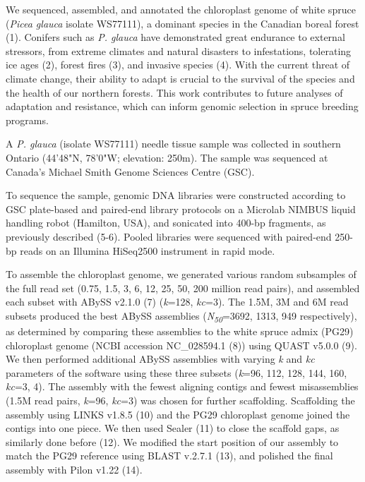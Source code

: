 \documentclass[titlepage,11pt, oneside]{article}   	%
\begin{document}
We sequenced, assembled, and annotated the chloroplast genome of white spruce (\textit{Picea glauca} isolate WS77111), a dominant species in the Canadian boreal forest (1). Conifers such as \textit{P. glauca} have demonstrated great endurance to external stressors, from extreme climates and natural disasters to infestations, tolerating ice ages (2), forest fires (3), and invasive species (4). With the current threat of climate change, their ability to adapt is crucial to the survival of the species and the health of our northern forests. This work contributes to future analyses of adaptation and resistance, which can inform genomic selection in spruce breeding programs.
\newline
\par
A \textit{P. glauca} (isolate WS77111) needle tissue sample was collected in southern Ontario (44'48"N, 78'0"W; elevation: 250m). The sample was sequenced at Canada’s Michael Smith Genome Sciences Centre (GSC).
\newline
\par
To sequence the sample, genomic DNA libraries were constructed according to GSC plate-based and paired-end library protocols on a Microlab NIMBUS liquid handling robot (Hamilton, USA), and sonicated into 400-bp fragments, as previously described (5-6). Pooled libraries were sequenced with paired-end 250-bp reads on an Illumina HiSeq2500 instrument in rapid mode.
\newline
\par
To assemble the chloroplast genome, we generated various random subsamples of the full read set (0.75, 1.5, 3, 6, 12, 25, 50, 200 million read pairs), and assembled each subset with ABySS v2.1.0 (7) (\textit{k}=128, \textit{kc}=3). The 1.5M, 3M and 6M read subsets produced the best ABySS assemblies (\textit{N\textsubscript{50}}=3692, 1313, 949 respectively), as determined by comparing these assemblies to the white spruce admix (PG29) chloroplast genome (NCBI accession NC\_028594.1 (8)) using QUAST v5.0.0 (9). We then performed additional ABySS assemblies with varying \textit{k} and \textit{kc} parameters of the software using these three subsets (\textit{k}=96, 112, 128, 144, 160, \textit{kc}=3, 4). The assembly with the fewest aligning contigs and fewest misassemblies (1.5M read pairs, \textit{k}=96, \textit{kc}=3) was chosen for further scaffolding. Scaffolding the assembly using LINKS v1.8.5 (10) and the PG29 chloroplast genome joined the contigs into one piece. We then used Sealer (11) to close the scaffold gaps, as similarly done before (12). We modified the start position of our assembly to match the PG29 reference using BLAST v.2.7.1 (13), and polished the final assembly with Pilon v1.22 (14).
\end{document}
